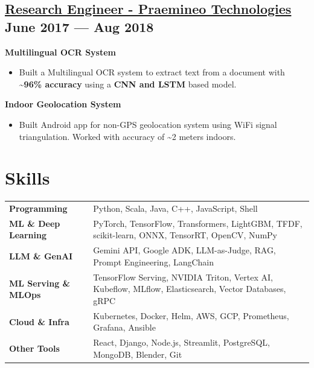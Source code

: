 \documentclass[a4,10pt]{article}
\newenvironment{zitemize}{
\begin{itemize}\itemsep0pt \parskip0pt \parsep1pt}
{\end{itemize}\vspace{-0.5cm}}
\newcommand{\hskills}[1]{
\textbf{\bfseries #1} }
\newcommand{\hrole}[2]{{\fontsize{11}{12}\selectfont \textbf{\underline{#1}}  \hfill{#2}}}
\newcommand{\hprojectname}[1]{\vspace{0.4cm}\noindent\textbf{#1}\vspace{-0.1cm}}
\begin{document}
\subsection{\hrole{Research Engineer - Praemineo Technologies}{June 2017 --- Aug 2018}}

    \hprojectname{Multilingual OCR System}
    \begin{zitemize}
        \item Built a Multilingual OCR system to extract text from a document with \textbf{\textasciitilde96\% accuracy} using a \textbf{CNN and LSTM} based model.
    \end{zitemize}

    \hprojectname{Indoor Geolocation System}
    \begin{zitemize}
        \item Built Android app for non-GPS geolocation system using WiFi signal triangulation. Worked with accuracy of \textasciitilde2 meters indoors.
    \end{zitemize}

\vspace{-0.1cm}

\section{Skills}
\begin{tabular}{p{12em} p{40em}}
\hskills{Programming} & Python, Scala, Java, C++, JavaScript, Shell \\
\hskills{ML \& Deep Learning} & PyTorch, TensorFlow, Transformers, LightGBM, TFDF, scikit-learn, ONNX, TensorRT, OpenCV, NumPy \\
\hskills{LLM \& GenAI} & Gemini API, Google ADK, LLM-as-Judge, RAG, Prompt Engineering, LangChain \\
\hskills{ML Serving \& MLOps} & TensorFlow Serving, NVIDIA Triton, Vertex AI, Kubeflow, MLflow, Elasticsearch, Vector Databases, gRPC \\
\hskills{Cloud \& Infra} & Kubernetes, Docker, Helm, AWS, GCP, Prometheus, Grafana, Ansible \\
\hskills{Other Tools} & React, Django, Node.js, Streamlit, PostgreSQL, MongoDB, Blender, Git \\
\end{tabular}
\vspace{-0.2cm}


\vspace{-0.2cm}
\end{document}
